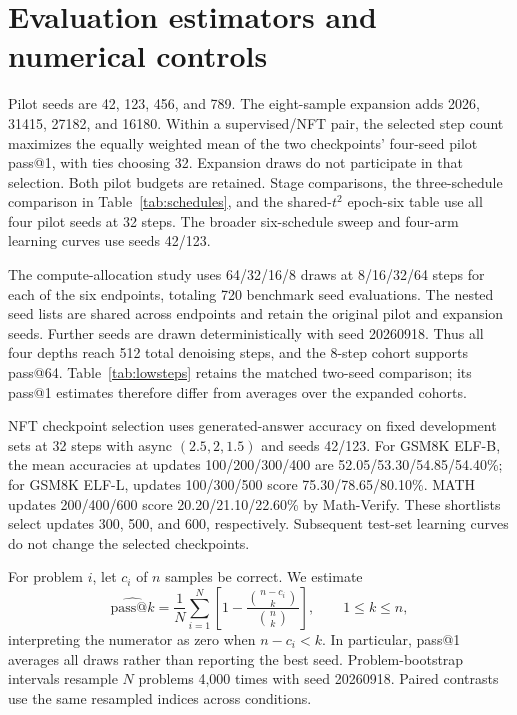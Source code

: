 \section{Evaluation estimators and numerical controls}
\label{app:evaluation}
Pilot seeds are 42, 123, 456, and 789. The eight-sample expansion adds 2026, 31415, 27182, and 16180. Within a supervised/NFT pair, the selected step count maximizes the equally weighted mean of the two checkpoints' four-seed pilot pass@1, with ties choosing 32. Expansion draws do not participate in that selection. Both pilot budgets are retained. Stage comparisons, the three-schedule comparison in Table~\ref{tab:schedules}, and the shared-$t^2$ epoch-six table use all four pilot seeds at 32 steps. The broader six-schedule sweep and four-arm learning curves use seeds 42/123.

The compute-allocation study uses 64/32/16/8 draws at 8/16/32/64 steps for each of the six endpoints, totaling 720 benchmark seed evaluations. The nested seed lists are shared across endpoints and retain the original pilot and expansion seeds. Further seeds are drawn deterministically with seed 20260918. Thus all four depths reach 512 total denoising steps, and the 8-step cohort supports pass@64. Table~\ref{tab:lowsteps} retains the matched two-seed comparison; its pass@1 estimates therefore differ from averages over the expanded cohorts.

NFT checkpoint selection uses generated-answer accuracy on fixed development sets at 32 steps with async $(2.5,2,1.5)$ and seeds 42/123. For GSM8K ELF-B, the mean accuracies at updates 100/200/300/400 are 52.05/53.30/54.85/54.40\%; for GSM8K ELF-L, updates 100/300/500 score 75.30/78.65/80.10\%. MATH updates 200/400/600 score 20.20/21.10/22.60\% by Math-Verify. These shortlists select updates 300, 500, and 600, respectively. Subsequent test-set learning curves do not change the selected checkpoints.

For problem $i$, let $c_i$ of $n$ samples be correct. We estimate
\begin{equation}
 \widehat{\mathrm{pass}@k}=
 \frac1N\sum_{i=1}^{N}\left[1-\frac{\binom{n-c_i}{k}}{\binom{n}{k}}\right],
 \qquad 1\le k\le n,
\end{equation}
interpreting the numerator as zero when $n-c_i<k$. In particular, pass@1 averages all draws rather than reporting the best seed. Problem-bootstrap intervals resample $N$ problems 4,000 times with seed 20260918. Paired contrasts use the same resampled indices across conditions.

